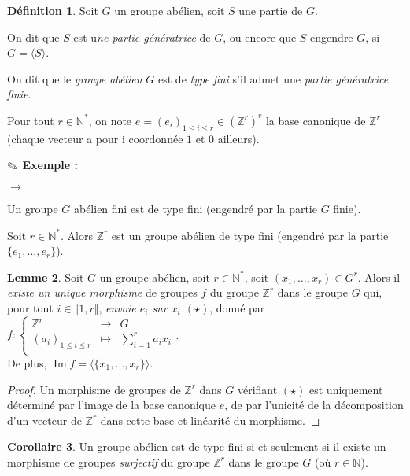 \documentclass{report}
\newcommand{\Z}{\mathbb{Z}}
\newcommand{\N}{\mathbb{N}}
\newcommand{\im}{\mathop{\mathrm{Im}}\nolimits}
\newcommand{\dis}{\displaystyle}
\newenvironment{ls}{\begin{list}{$\to$}{}}{\end{list}}
\newcommand{\nt}[1]{\llbracket  #1 \rrbracket }
\theoremstyle{definition}
\newtheorem{defi}{Définition}[chapter]
\newtheorem{lem}[defi]{Lemme}
\newtheorem{coro}[defi]{Corollaire}
\newcommand{\exem}{{\textbf{$\text{\ding{46}}$ Exemple : \ }}}
\newcommand{\app}[5]{#1:\left\{\begin{array}{ccl}
#2 & \longrightarrow & #3 \\
#4 & \longmapsto & #5  \\
\end{array}\right.
}
\begin{document}
\begin{defi}
Soit $G$ un groupe abélien, soit $S$ une partie de $G$. 
\begin{point}
\item On dit que $S$ est u\textit{ne partie génératrice} de $G$, ou encore que $S$ engendre $G$, si $G=\langle S\rangle$.
\item On dit que le \textit{groupe abélien} $G$ est de \textit{type fini} s'il admet une \textit{partie génératrice finie}. 
\end{point}
\end{defi}

Pour tout $r \in \N^*$, on note $e=(e_i)_{1 \leqslant i \leqslant r} \in \left(\Z^r\right)^r$ la base canonique de $\Z^r$ (chaque vecteur a pour i coordonnée $1$ et $0$ ailleurs).

\exem
\begin{ls}
\item Un groupe $G$ abélien fini est de type fini (engendré par la partie $G$ finie).
\item Soit $r \in \N^*$. Alors $\Z^r$ est un groupe abélien de type fini (engendré par la partie $\{e_1, \ldots, e_r \}$).
\end{ls}
\begin{lem}\label{morphisme-Zr-G}
Soit $G$ un groupe abélien, soit $r \in \N^*$, soit $(x_1, \ldots, x_r) \in G^r$. Alors il \textit{existe un unique morphisme} de groupes $f$ du groupe $\Z^r$ dans le groupe $G$ qui, pour tout $i \in \nt{1,r}$, \textit{envoie $e_i$ sur $x_i$ $(\star)$}, donné par $\app{f}{\Z^r}{G}{(a_i)_{1 \leqslant i \leqslant r}}{\dis \sum_{i=1}^ra_ix_i}$. \\ De plus, $\im f =\langle\{x_1, \ldots, x_r\}\rangle$.
\end{lem}

\begin{proof}
Un morphisme de groupes de $\Z^r$ dans $G$ vérifiant $(\star)$ est uniquement déterminé par l'image de la base canonique $e$, de par l'unicit\'e de la décomposition d'un vecteur de $\Z^r$ dans cette base et linéarité du morphisme.
\end{proof}

\begin{coro}\label{type-fini-et-Zr}
Un groupe abélien est de type fini si et seulement si il existe un morphisme de groupes \textit{surjectif} du groupe $\Z^r$ dans le groupe $G$ (où $r \in \N$).
\end{coro}
\end{document}
